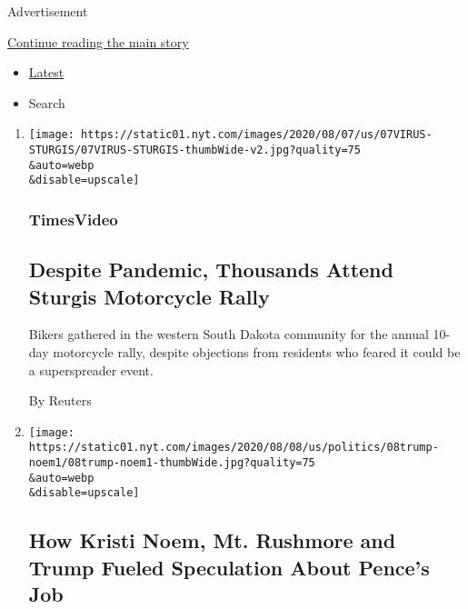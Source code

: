 Advertisement

\protect\hyperlink{after-mid1}{Continue reading the main story}

\begin{itemize}
\tightlist
\item
  \protect\hyperlink{stream-panel}{Latest}
\item
  Search
\end{itemize}

\begin{enumerate}
\def\labelenumi{\arabic{enumi}.}
\item
  \href{/video/us/100000007279713/sturgis-motorcycle-rally-coronavirus.html}{}

  \texttt{[image: https://static01.nyt.com/images/2020/08/07/us/07VIRUS-STURGIS/07VIRUS-STURGIS-thumbWide-v2.jpg?quality=75\\\&auto=webp\\\&disable=upscale]}

  \hypertarget{timesvideo}{%
  \subsubsection{TimesVideo}\label{timesvideo}}

  \hypertarget{despite-pandemic-thousands-attend-sturgis-motorcycle-rally}{%
  \subsection{Despite Pandemic, Thousands Attend Sturgis Motorcycle
  Rally}\label{despite-pandemic-thousands-attend-sturgis-motorcycle-rally}}

  Bikers gathered in the western South Dakota community for the annual
  10-day motorcycle rally, despite objections from residents who feared
  it could be a superspreader event.

  By Reuters
\item
  \href{/2020/08/08/us/politics/kristi-noem-pence-trump.html}{}

  \texttt{[image: https://static01.nyt.com/images/2020/08/08/us/politics/08trump-noem1/08trump-noem1-thumbWide.jpg?quality=75\\\&auto=webp\\\&disable=upscale]}

  \hypertarget{how-kristi-noem-mt-rushmore-and-trump-fueled-speculation-about-pences-job}{%
  \subsection{How Kristi Noem, Mt. Rushmore and Trump Fueled Speculation
  About Pence's
  Job}\label{how-kristi-noem-mt-rushmore-and-trump-fueled-speculation-about-pences-job}}


\end{enumerate}
